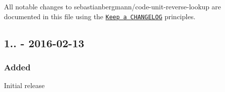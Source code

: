All notable changes to {\ttfamily sebastianbergmann/code-\/unit-\/reverse-\/lookup} are documented in this file using the \href{http://keepachangelog.com/}{\tt Keep a C\+H\+A\+N\+G\+E\+L\+OG} principles.

\subsection*{1.. -\/ 2016-\/02-\/13}

\subsubsection*{Added}


\begin{DoxyItemize}
\item Initial release 
\end{DoxyItemize}